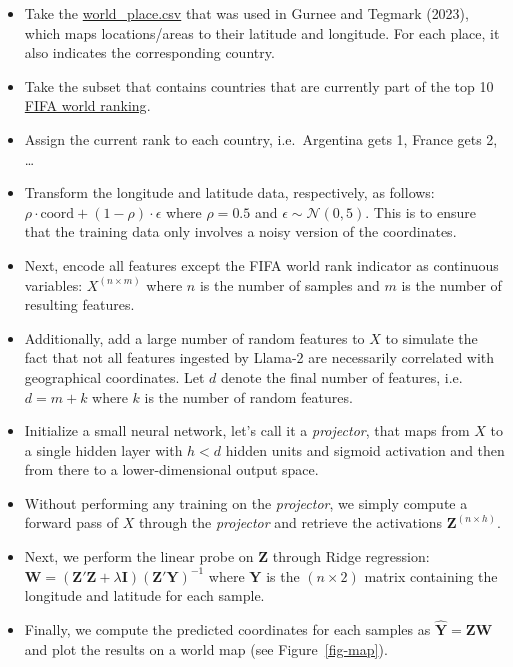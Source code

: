 \documentclass[
  letterpaper,
  DIV=11,
  numbers=noendperiod]{scrartcl}
\providecommand{\tightlist}{%
  \setlength{\itemsep}{0pt}\setlength{\parskip}{0pt}}\usepackage{longtable,booktabs,array}
\begin{document}
\begin{itemize}
\tightlist
\item
  Take the
  \href{https://github.com/wesg52/world-models/blob/main/data/entity_datasets/world_place.csv}{world\_place.csv}
  that was used in Gurnee and Tegmark (2023), which maps locations/areas
  to their latitude and longitude. For each place, it also indicates the
  corresponding country.
\item
  Take the subset that contains countries that are currently part of the
  top 10
  \href{https://www.fifa.com/fifa-world-ranking/men?dateId=id14142}{FIFA
  world ranking}.
\item
  Assign the current rank to each country, i.e.~Argentina gets 1, France
  gets 2, \ldots{}
\item
  Transform the longitude and latitude data, respectively, as follows:
  \(\rho \cdot \text{coord} + (1-\rho) \cdot \epsilon\) where
  \(\rho=0.5\) and \(\epsilon \sim \mathcal{N}(0, 5)\). This is to
  ensure that the training data only involves a noisy version of the
  coordinates.
\item
  Next, encode all features except the FIFA world rank indicator as
  continuous variables: \(X^{(n \times m)}\) where \(n\) is the number
  of samples and \(m\) is the number of resulting features.
\item
  Additionally, add a large number of random features to \(X\) to
  simulate the fact that not all features ingested by Llama-2 are
  necessarily correlated with geographical coordinates. Let \(d\) denote
  the final number of features, i.e.~\(d=m+k\) where \(k\) is the number
  of random features.
\item
  Initialize a small neural network, let's call it a \emph{projector},
  that maps from \(X\) to a single hidden layer with \(h<d\) hidden
  units and sigmoid activation and then from there to a
  lower-dimensional output space.
\item
  Without performing any training on the \emph{projector}, we simply
  compute a forward pass of \(X\) through the \emph{projector} and
  retrieve the activations \(\mathbf{Z}^{(n\times h)}\).
\item
  Next, we perform the linear probe on \(\mathbf{Z}\) through Ridge
  regression:
  \(\mathbf{W} = (\mathbf{Z}'\mathbf{Z} + \lambda \mathbf{I}) (\mathbf{Z}'\mathbf{Y})^{-1}\)
  where \(\mathbf{Y}\) is the \((n \times 2)\) matrix containing the
  longitude and latitude for each sample.
\item
  Finally, we compute the predicted coordinates for each samples as
  \(\widehat{\mathbf{Y}}=\mathbf{Z}\mathbf{W}\) and plot the results on
  a world map (see Figure~\ref{fig-map}).
\end{itemize}
\end{document}
